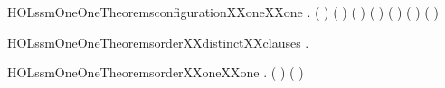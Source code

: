 \begin{SaveVerbatim}{HOLssmOneOneTheoremsconfigurationXXoneXXone}
\HOLTokenTurnstile{} \HOLSymConst{\HOLTokenForall{}}           .
     (       \HOLSymConst{=}       ) \HOLSymConst{\HOLTokenEquiv{}}
     ( \HOLSymConst{=} ) \HOLSymConst{\HOLTokenConj{}} ( \HOLSymConst{=} ) \HOLSymConst{\HOLTokenConj{}} ( \HOLSymConst{=} ) \HOLSymConst{\HOLTokenConj{}} ( \HOLSymConst{=} ) \HOLSymConst{\HOLTokenConj{}}
     ( \HOLSymConst{=} ) \HOLSymConst{\HOLTokenConj{}} ( \HOLSymConst{=} )
\end{SaveVerbatim}
\newcommand{\HOLssmOneOneTheoremsconfigurationXXoneXXone}{\UseVerbatim{HOLssmOneOneTheoremsconfigurationXXoneXXone}}
\begin{SaveVerbatim}{HOLssmOneOneTheoremsorderXXdistinctXXclauses}
\HOLTokenTurnstile{} \HOLSymConst{\HOLTokenForall{}}.   \HOLSymConst{\HOLTokenNotEqual{}} 
\end{SaveVerbatim}
\newcommand{\HOLssmOneOneTheoremsorderXXdistinctXXclauses}{\UseVerbatim{HOLssmOneOneTheoremsorderXXdistinctXXclauses}}
\begin{SaveVerbatim}{HOLssmOneOneTheoremsorderXXoneXXone}
\HOLTokenTurnstile{} \HOLSymConst{\HOLTokenForall{}} . (  \HOLSymConst{=}  ) \HOLSymConst{\HOLTokenEquiv{}} ( \HOLSymConst{=} )
\end{SaveVerbatim}
